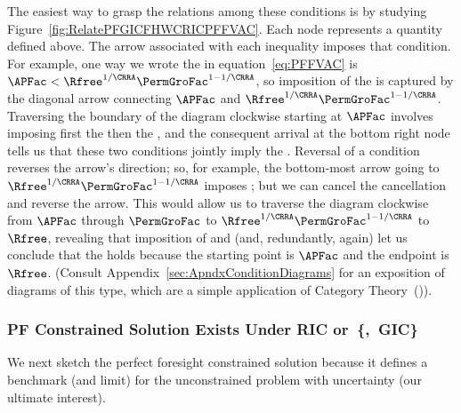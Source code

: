 \documentclass[BufferStockTheory]{subfiles}
\begin{document}
The easiest way to grasp the relations among these conditions is by studying Figure~\ref{fig:RelatePFGICFHWCRICPFFVAC}.  Each node represents a quantity defined above.  The arrow associated with each inequality imposes that condition.  For example, one way we wrote the {\PFFVAC} in equation~\eqref{eq:PFFVAC} is $\APFac < \Rfree^{1/\CRRA} \PermGroFac^{1-1/\CRRA}$, so imposition of the {\PFFVAC} is captured by the diagonal arrow connecting $\APFac$ and $\Rfree^{1/\CRRA}\PermGroFac^{1-1/\CRRA}$.  Traversing the boundary of the diagram clockwise starting at $\APFac$ involves imposing first the {\GICRaw} then the {\FHWC}, and the consequent arrival at the bottom right node tells us that these two conditions jointly imply the {\PFFVAC}.  Reversal of a condition reverses the arrow's direction; so, for example, the bottom-most arrow going to $\Rfree^{1/\CRRA}\PermGroFac^{1-1/\CRRA}$ imposes {\cncl{\FHWC}}; but we can cancel the cancellation and reverse the arrow.  This would allow us to traverse the diagram clockwise from $\APFac$  through $\PermGroFac$ to $\Rfree^{1/\CRRA}\PermGroFac^{1-1/\CRRA}$ to $\Rfree$, revealing that imposition of {\GICRaw} and {\FHWC} (and, redundantly, {\FHWC} again) let us conclude that the {\RIC} holds because the starting point is $\APFac$ and the endpoint is $\Rfree$.  (Consult Appendix~\ref{sec:ApndxConditionDiagrams} for an exposition of diagrams of this type, which are a simple application of Category Theory~(\cite{riehl2017category})).

\providecommand{\figName}{RelatePFGICFHWCRICPFFVAC} 
\providecommand{\figFile}{\figName} %
\hypertarget{\figName}{}

\hypertarget{PF-Constrained-Solution}{}
\hypertarget{Constrained-Solution}{}
\subsubsection{PF Constrained Solution Exists Under RIC or~\texorpdfstring{\{,~GIC\}}{RIC-Fails,~GIC}}\label{subsec:PFCon}

We next sketch the perfect foresight constrained solution because it defines a benchmark (and limit) for the unconstrained problem with uncertainty (our ultimate interest).
\end{document}
